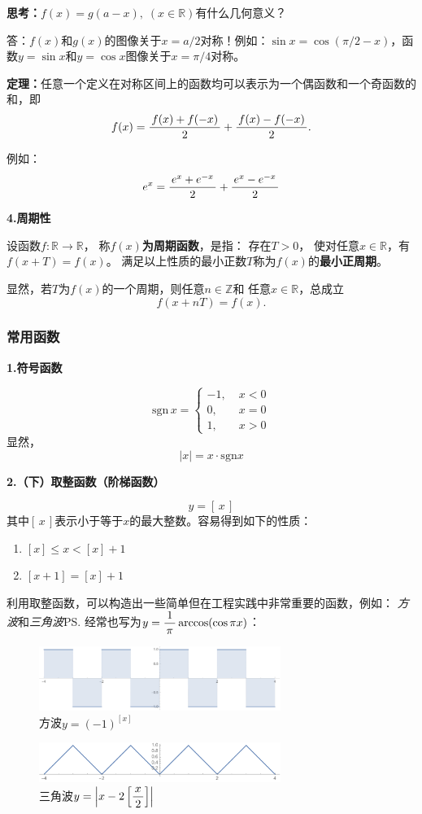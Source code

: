 \bs
{\bf 思考：}$f(x)=g(a-x),\;(x\in\mathbb{R})$有什么几何意义？

\ifhint
答：$f(x)$和$g(x)$的图像关于$x=a/2$对称！例如：$\sin x
=\cos(\pi/2-x)$，函数$y=\sin x$和$y=\cos x$图像关于$x=\pi/4$对称。
\fi

\bs
\begin{thx}
	{\bf 定理：}任意一个定义在对称区间上的函数均可以表示为一个偶函数和一个奇函数的和，即
	$$f(x)=\displaystyle\frac{\,{f(x)+f(-x)}\,}{\,{2}\,}+\displaystyle\frac{\,{f(x)-f(-x)}\,}{\,{2}\,}.$$
\end{thx}
例如：
$$e^x=\displaystyle\frac{\,{e^x+e^{-x}}\,}{\,{2}\,}+\displaystyle\frac{\,{e^x-e^{-x}}\,}{\,{2}\,}$$

\bs
{\bf 4.周期性}

设函数$f:\mathbb{R}\to\mathbb{R}$，
称{\bf $f(x)$为周期函数}，是指： 存在$T>0$，
使对任意$x\in\mathbb{R}$，有
$f(x+T)=f(x)$。
满足以上性质的最小正数$T$称为$f(x)$的{\bf 最小正周期}。
		 
显然，若$T$为$f(x)$的一个周期，则任意$n\in\mathbb{Z}$和
任意$x\in\mathbb{R}$，总成立
$$f(x+nT)=f(x).$$

\subsubsection{常用函数}

{\bf 1.符号函数}

$$\mathrm{sgn}\,x =\left\{
\begin{array}{rl}
-1,\;&x<0 \\
0,\;&x=0 \\
1,\;&x>0
\end{array}
\right.$$
显然，
$$|x|=x \cdot\mathrm{sgn} x$$
	
{\bf 2.（下）取整函数（阶梯函数）}

$$y=\left[ \,x\, \right]$$
其中$[\,x\,]$表示小于等于$x$的最大整数。容易得到如下的性质：
\begin{enumerate}[(1)]
  \setlength{\itemindent}{1cm}
  \item $[x]\leq x<[x]+1$
  \item $[x+1]=[x]+1$
\end{enumerate}

\bs
利用取整函数，可以构造出一些简单但在工程实践中非常重要的函数，例如：
{\it 方波}和{\it 三角波}\ps{经常也写为$y=\displaystyle\frac{\,{1}\,}{\,{\pi}\,}\arccos(\cos\pi x)$}：
\begin{figure}[h]
	\centering
	\includegraphics[width=0.7\textwidth]{./images/ch01/rectWave.pdf}
	\caption{方波$y=(-1)^{[x]}$}
	\label{fig:rectWave}
\end{figure}
\begin{figure}[h]
	\centering
	\includegraphics[width=0.7\textwidth]{./images/ch01/triWave.pdf}
	\caption{三角波$y=\left|x-2\left[\displaystyle\frac{\,{x}\,}{\,{2}\,}\right]\right|$}
	\label{fig:triWave}
\end{figure}

